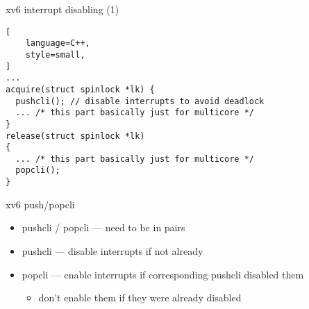 \begin{frame}[fragile,label=xv6IntDis1]{xv6 interrupt disabling (1)}
\begin{lstlisting}[
    language=C++,
    style=small,
]
...
acquire(struct spinlock *lk) {
  pushcli(); // disable interrupts to avoid deadlock
  ... /* this part basically just for multicore */
}
release(struct spinlock *lk)
{
  ... /* this part basically just for multicore */
  popcli();
}
\end{lstlisting}
\end{frame}

\begin{frame}{xv6 push/popcli}
\begin{itemize}
\item pushcli / popcli --- need to be in pairs
\item pushcli --- disable interrupts if not already
\item popcli --- enable interrupts if corresponding pushcli disabled them
    \begin{itemize}
    \item don't enable them if they were already disabled
    \end{itemize}
\end{itemize}
\end{frame}
